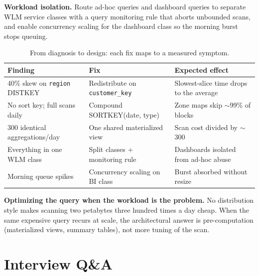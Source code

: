\textbf{Workload isolation.} Route ad-hoc queries and dashboard queries to separate WLM service classes with a query monitoring rule that aborts unbounded scans, and enable concurrency scaling for the dashboard class so the morning burst stops queuing.

\begin{table}[H]
\centering
\small
\begin{tabular}{@{}p{4.4cm}p{4.2cm}p{4.4cm}@{}}
\toprule
\textbf{Finding} & \textbf{Fix} & \textbf{Expected effect} \\
\midrule
40\% skew on \texttt{region} DISTKEY & Redistribute on \texttt{customer\_key} & Slowest-slice time drops to the average \\
No sort key; full scans daily & Compound SORTKEY(date, type) & Zone maps skip $\sim$99\% of blocks \\
300 identical aggregations/day & One shared materialized view & Scan cost divided by $\sim$300 \\
Everything in one WLM class & Split classes + monitoring rule & Dashboards isolated from ad-hoc abuse \\
Morning queue spikes & Concurrency scaling on BI class & Burst absorbed without resize \\
\bottomrule
\end{tabular}
\caption{From diagnosis to design: each fix maps to a measured symptom.}
\label{tab:ch6-rescue}
\end{table}

\begin{pitfall}
\textbf{Optimizing the query when the workload is the problem.} No distribution style makes scanning two petabytes three hundred times a day cheap. When the same expensive query recurs at scale, the architectural answer is pre-computation (materialized views, summary tables), not more tuning of the scan.
\end{pitfall}

\section{Interview Q\&A}

